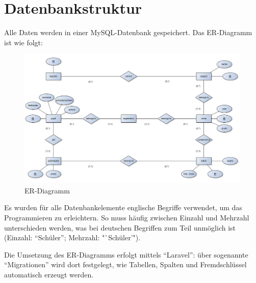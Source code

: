 \section{Datenbankstruktur}

Alle Daten werden in einer MySQL-Datenbank gespeichert. Das ER-Diagramm ist wie folgt: 

\begin{figure}[ht]
	\centering
	\includegraphics[scale=.50]{bilder/ER-Modell_engl.PNG}
	\caption{ER-Diagramm}
	\label{abb:beispiel}
\end{figure}

Es wurden für alle Datenbankelemente englische Begriffe verwendet, um das Programmieren zu erleichtern. So muss häufig zwischen Einzahl und Mehrzahl unterschieden werden, was bei deutschen Begriffen zum Teil unmöglich ist (Einzahl: "`Schüler"'; Mehrzahl: "`Schüler'").

Die Umsetzung des ER-Diagramms erfolgt mittels "`Laravel"': über sogenannte "`Migrationen"' wird dort festgelegt, wie Tabellen, Spalten und Fremdschlüssel automatisch erzeugt werden.